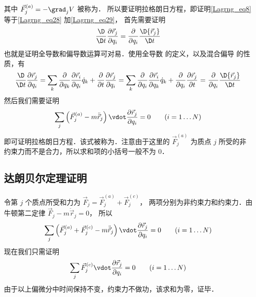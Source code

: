 其中 ${\vec F}_j^{(a)} = - {\grad_j}V$ 被称为．%
所以要证明拉格朗日方程，即证明\autoref{Lagrng_eq8} 等于\autoref{Lagrng_eq28} 加\autoref{Lagrng_eq29}， 首先需要证明
\begin{equation}
\frac{\D}{{\D t}}\frac{{\partial {{\vec r}_j}}}{{\partial {q_i}}} = \frac{\partial }{{\partial {q_i}}}\frac{{\D{{\vec r}_j}}}{{\D t}}
\end{equation}
也就是证明全导数和偏导数运算可对易．使用全导数 的定义，以及混合偏导 的性质，有
\begin{equation}
\frac{\D}{{\D t}}\frac{{\partial {{\vec r}_j}}}{{\partial {q_i}}} = \sum\limits_k {\frac{\partial }{{\partial {q_k}}}\frac{{\partial {{\vec r}_i}}}{{\partial {q_i}}}{{\dot q}_k}}  + \frac{\partial }{{\partial t}}\frac{{\partial {{\vec r}_j}}}{{\partial {q_i}}} = \sum\limits_k {\frac{\partial }{{\partial {q_i}}}\frac{{\partial {{\vec r}_i}}}{{\partial {q_k}}}{{\dot q}_k}}  + \frac{\partial }{{\partial {q_i}}}\frac{{\partial {{\vec r}_j}}}{{\partial t}}{\text{ = }}\frac{\partial }{{\partial {q_i}}}\frac{{\D{{\vec r}_j}}}{{\D t}}
\end{equation}
然后我们需要证明
\begin{equation}
\sum\limits_j {\left( {\vec F_j^{(a)} - m\ddot{\vec r}_j} \right) \vdot \frac{{\partial {{\vec r}_j}}}{{\partial {q_i}}}}  = 0
\qquad (i = 1\dots N)
\end{equation}
即可证明拉格朗日方程．该式被称为．注意由于这里的 $\vec F_j^{(a)}$ 为质点 $j$ 所受的非约束力而不是合力，所以求和项的小括号一般不为 0．

\subsection{达朗贝尔定理证明}
令第 $j$ 个质点所受和力为 $\vec F_j = \vec F_j^{(a)} + \vec F_j^{(c)}$， 两项分别为非约束力和约束力．由牛顿第二定律 $\vec F_j - m\ddot{\vec r}_j = 0$， 所以
\begin{equation}
\sum\limits_j {\left( {\vec F_j^{(a)}+\vec F_j^{(c)} - m\ddot{\vec r}_j} \right) \vdot \frac{{\partial {{\vec r}_j}}}{{\partial {q_i}}}}  = 0
\qquad (i = 1\dots N)
\end{equation}
现在我们只需证明
\begin{equation}
\sum\limits_j { {\vec F_j^{(c)}} \vdot \frac{{\partial {{\vec r}_j}}}{{\partial {q_i}}}}  = 0
\qquad (i = 1\dots N)
\end{equation}
由于以上偏微分中时间保持不变，约束力不做功，该求和为零，证毕．%



